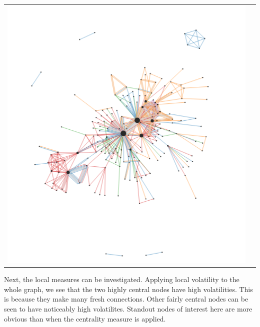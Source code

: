 \begin{center}
\begin{tabular}{cc}
\label{marieBoucherLocalVolatilityFull}
\includegraphics[trim={0 0 0 0}, width=140mm]{./Figures/marieBoucherLocalVolatilityFull.png}
\end{tabular}
\end{center}   
Next, the local measures can be investigated. Applying local volatility to the whole graph, we see that the two highly central nodes have high volatilities. This is because they make many fresh connections. Other fairly central nodes can be seen to have noticeably high volatilites. Standout nodes of interest here are more obvious than when the centrality measure is applied.
